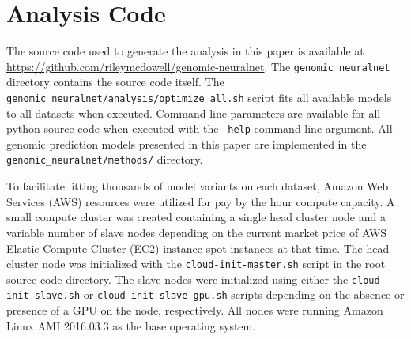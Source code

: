\chapter*{Analysis Code} \label{app:analysis-code}

The source code used to generate the analysis in this paper is available at 
\url{https://github.com/rileymcdowell/genomic-neuralnet}. The \texttt{genomic\_neuralnet}
directory contains the source code itself. The 
\texttt{genomic\_neuralnet/analysis/optimize\_all.sh} script fits all available 
models to all datasets when executed. Command line parameters are available for all python source
code when executed with the \texttt{--help} command line argument. All genomic prediction models presented in this 
paper are implemented in the \texttt{genomic\_neuralnet/methods/} directory. 

To facilitate fitting thousands of model variants on each dataset, Amazon Web Services (AWS) 
resources were utilized for pay by the hour compute capacity. A small compute cluster was 
created containing a single head cluster node and a variable number of slave nodes depending
on the current market price of AWS Elastic Compute Cluster (EC2) instance spot instances at that time.
The head cluster node was initialized with the \texttt{cloud-init-master.sh} script in 
the root source code directory. The slave nodes were initialized
using either the \texttt{cloud-init-slave.sh} or \texttt{cloud-init-slave-gpu.sh} scripts
depending on the absence or presence of a GPU on the node, respectively. All
nodes were running Amazon Linux AMI 2016.03.3 as the base operating system.

